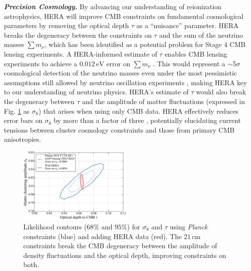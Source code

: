 \documentclass[preprint,11pt]{aastex}
\begin{document}
\emph{\textbf{Precision Cosmology.}}
\label{sec:tau}
By advancing our understanding of reionization astrophysics, HERA will improve CMB constraints on 
fundamental cosmological parameters by
removing the optical depth
$\tau$ as a ``nuisance'' parameter. HERA breaks the degeneracy between the
constraints on $\tau$ and the sum of the neutrino masses $\sum m_\nu$, which has
been identified as a potential problem for Stage 4 CMB lensing experiments. A
HERA-informed estimate of $\tau$ enables CMB lensing experiments to achieve a
$0.012\,\textrm{eV}$ error on $\sum m_\nu$ \citep{liu_et_al2015}. This would
represent a $\sim$5$\sigma$ cosmological detection of the neutrino masses even
under the most pessimistic assumptions
still allowed by neutrino oscillation experiments
\citep{allison_et_al2015}, making HERA key to our understanding of neutrino
physics. HERA's estimate of $\tau$ would also break the degeneracy between
$\tau$ and the amplitude of matter fluctuations (expressed in Fig.
\ref{fig:sigma8Tau} as $\sigma_8$) that arises when using only
CMB data. HERA effectively reduces error bars on $\sigma_8$ by more
than a factor of three \citep{liu_et_al2015}, potentially elucidating
current tensions between cluster cosmology constraints and those from primary
CMB anisotropies.


\begin{figure}[h!]
\centering
    \includegraphics[width=0.50\textwidth,clip]{plots/sigmaTau.pdf}
\caption{Likelihood contours ($68\%$ and $95\%$) for $\sigma_8$ and $\tau$ using \emph{Planck} constraints (blue) and 
adding HERA data (red). 
The $21\,\textrm{cm}$ constraints break the CMB degeneracy between the amplitude of density fluctuations and the optical depth, improving constraints on both.}
	\label{fig:sigma8Tau}
\end{figure} 
\end{document}
